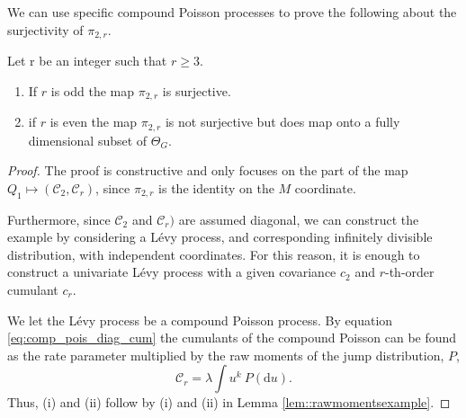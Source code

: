 \documentclass{biometrika}
\begin{document}
We can use specific compound Poisson processes to prove the following about the surjectivity of $\pi_{2,r}$. 
\begin{proposition} \label{prop::piSurjective}
Let r be an integer such that $r \geq 3$. 
\begin{enumerate}[label = (\roman*),leftmargin=*, widest=iii]
        \item If $r$ is odd the map $\pi_{2,r}$ is surjective. 
        \item if $r$ is even the map $\pi_{2,r}$ is not surjective but does map onto a fully dimensional subset of $\Theta_G$.
    \end{enumerate}
\end{proposition}
\begin{proof}
    The proof is constructive and only focuses on the part of the map $Q_1 \mapsto (\mathcal{C}_2, \mathcal{C}_r)$, since $\pi_{2,r}$ is the identity on the $M$ coordinate. 

    Furthermore, since $\mathcal{C}_2$ and $\mathcal{C}_r)$ are assumed diagonal, we can construct the example by considering a Lévy process, and corresponding infinitely divisible distribution, with independent coordinates. For this reason, it is enough to construct a univariate 
    Lévy process with a given covariance $c_2$ and $r$-th-order cumulant $c_r$. 

     We let the Lévy process be a compound Poisson process. 
     By equation \eqref{eq:comp_pois_diag_cum} the cumulants of the compound Poisson can be found as the rate parameter multiplied by the raw moments of the jump distribution, $P$, 
    \begin{equation*}
        \mathcal{C}_r = \lambda \int u^k \ P(\mathrm{d} u).
    \end{equation*}
    Thus, (i) and (ii) follow by (i) and (ii) in Lemma \ref{lem::rawmomentsexample}. 
\end{proof}

 
\end{document}
